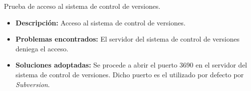 \item Prueba de acceso al sistema de control de versiones.
  \begin{itemize}
    \item \textbf{Descripción:} Acceso al sistema de control de versiones.
    \item \textbf{Problemas encontrados:} El servidor del sistema de control de
    versiones deniega el acceso.
    \item \textbf{Soluciones adoptadas:} Se procede a abrir el puerto 3690 en
    el servidor del sistema de control de versiones. Dicho puerto es el
    utilizado por defecto por \textit{Subversion}.
  \end{itemize}

